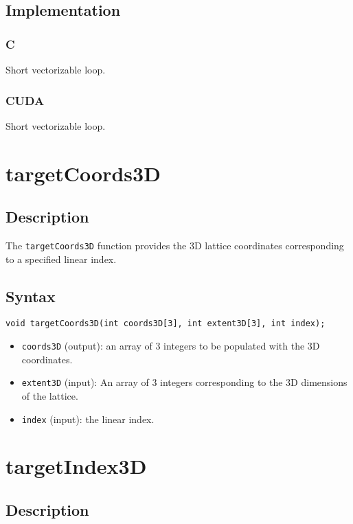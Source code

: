 \subsection{Implementation}
\subsubsection{C}
Short vectorizable loop.
\subsubsection{CUDA}
Short vectorizable loop.

\newpage
\section{targetCoords3D}

\subsection{Description}

The \verb+targetCoords3D+ function provides the 3D lattice coordinates corresponding to a specified linear index.

\subsection{Syntax}
\begin{verbatim}
void targetCoords3D(int coords3D[3], int extent3D[3], int index);
\end{verbatim}

\begin{itemize}
\item \verb+coords3D+ (output): an array of 3 integers to be populated with the 3D coordinates.
\item \verb+extent3D+ (input): An array of 3 integers corresponding to the 3D dimensions of the lattice.
\item \verb+index+ (input): the linear index. 

\end{itemize}


\newpage
\section{targetIndex3D}

\subsection{Description}

